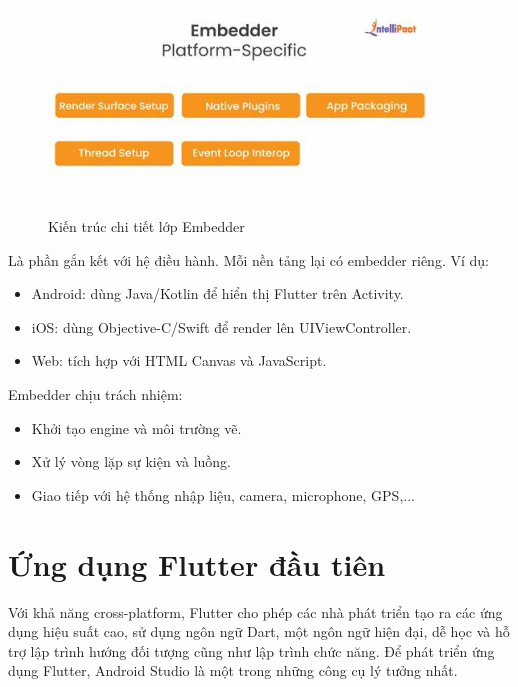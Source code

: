 \documentclass[../DoAn.tex]{subfiles}
\numberwithin{figure}{chapter}
\begin{document}
\begin{figure}[H]
    \centering
    \includegraphics[width=0.9\textwidth]{Hinhve/Chuong5/embedderlayer.jpg}
    \caption{Kiến trúc chi tiết lớp Embedder}
    \label{fig:embedderlayer}
\end{figure}

Là phần gắn kết với hệ điều hành. Mỗi nền tảng lại có embedder riêng. Ví dụ:
\begin{itemize}
    \item Android: dùng Java/Kotlin để hiển thị Flutter trên Activity.
    \item iOS: dùng Objective-C/Swift để render lên UIViewController.
    \item Web: tích hợp với HTML Canvas và JavaScript.
\end{itemize}

Embedder chịu trách nhiệm:
    \begin{itemize}
        \item Khởi tạo engine và môi trường vẽ.
        \item Xử lý vòng lặp sự kiện và luồng.
        \item Giao tiếp với hệ thống nhập liệu, camera, microphone, GPS,...
    \end{itemize}

\section{Ứng dụng Flutter đầu tiên}
Với khả năng cross-platform, Flutter cho phép các nhà phát triển tạo ra các ứng dụng hiệu suất cao, sử dụng ngôn ngữ Dart, một ngôn ngữ hiện đại, dễ học và hỗ trợ lập trình hướng đối tượng cũng như lập trình chức năng. Để phát triển ứng dụng Flutter, Android Studio là một trong những công cụ lý tưởng nhất. 
\end{document}
